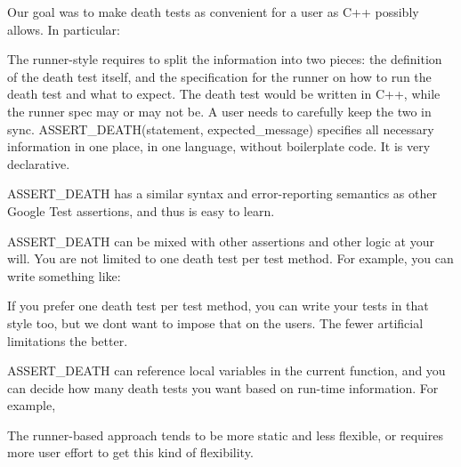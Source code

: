 Our goal was to make death tests as convenient for a user as C++ possibly allows. In particular\+:


\begin{DoxyItemize}
\item The runner-\/style requires to split the information into two pieces\+: the definition of the death test itself, and the specification for the runner on how to run the death test and what to expect. The death test would be written in C++, while the runner spec may or may not be. A user needs to carefully keep the two in sync. {\ttfamily A\+S\+S\+E\+R\+T\+\_\+\+D\+E\+A\+T\+H(statement, expected\+\_\+message)} specifies all necessary information in one place, in one language, without boilerplate code. It is very declarative.
\item {\ttfamily A\+S\+S\+E\+R\+T\+\_\+\+D\+E\+A\+TH} has a similar syntax and error-\/reporting semantics as other Google Test assertions, and thus is easy to learn.
\item {\ttfamily A\+S\+S\+E\+R\+T\+\_\+\+D\+E\+A\+TH} can be mixed with other assertions and other logic at your will. You are not limited to one death test per test method. For example, you can write something like\+: 
\begin{DoxyCode}{0}
\DoxyCodeLine{\}}
\end{DoxyCode}
 If you prefer one death test per test method, you can write your tests in that style too, but we don\textquotesingle{}t want to impose that on the users. The fewer artificial limitations the better.
\item {\ttfamily A\+S\+S\+E\+R\+T\+\_\+\+D\+E\+A\+TH} can reference local variables in the current function, and you can decide how many death tests you want based on run-\/time information. For example, 
\begin{DoxyCode}{0}
\DoxyCodeLine{\}}
\end{DoxyCode}
 The runner-\/based approach tends to be more static and less flexible, or requires more user effort to get this kind of flexibility.
\end{DoxyItemize}

